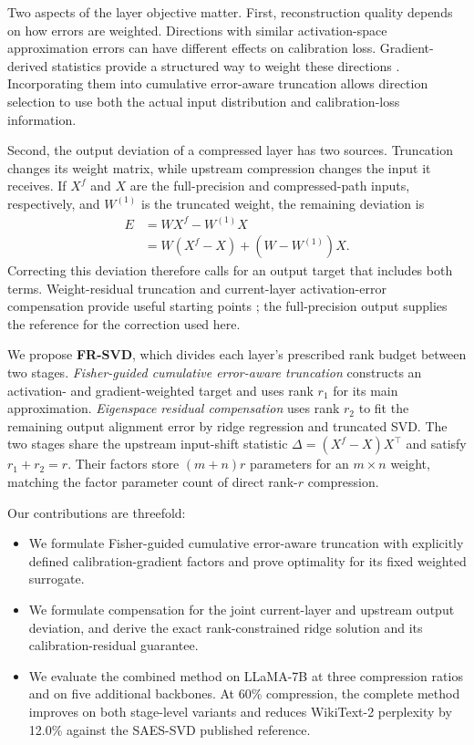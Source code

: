 \documentclass[11pt]{article}
\begin{document}
Two aspects of the layer objective matter. First, reconstruction quality depends on how errors are weighted. Directions with similar activation-space approximation errors can have different effects on calibration loss. Gradient-derived statistics provide a structured way to weight these directions \citep{hsu2022fwsvd,chekalina2025gfwsvd}. Incorporating them into cumulative error-aware truncation allows direction selection to use both the actual input distribution and calibration-loss information.

Second, the output deviation of a compressed layer has two sources. Truncation changes its weight matrix, while upstream compression changes the input it receives. If $X^f$ and $X$ are the full-precision and compressed-path inputs, respectively, and $W^{(1)}$ is the truncated weight, the remaining deviation is
\begin{equation}
\begin{aligned}
E&=WX^f-W^{(1)}X\\
 &=W(X^f-X)+(W-W^{(1)})X.
\end{aligned}
\label{eq:error-decomposition-intro}
\end{equation}
Correcting this deviation therefore calls for an output target that includes both terms. Weight-residual truncation and current-layer activation-error compensation provide useful starting points \citep{bai2025ercsvd,liu2025eora}; the full-precision output supplies the reference for the correction used here.

We propose \textbf{FR-SVD}, which divides each layer's prescribed rank budget between two stages. \emph{Fisher-guided cumulative error-aware truncation} constructs an activation- and gradient-weighted target and uses rank $r_1$ for its main approximation. \emph{Eigenspace residual compensation} uses rank $r_2$ to fit the remaining output alignment error by ridge regression and truncated SVD. The two stages share the upstream input-shift statistic $\Delta=(X^f-X)X^\top$ and satisfy $r_1+r_2=r$. Their factors store $(m+n)r$ parameters for an $m\times n$ weight, matching the factor parameter count of direct rank-$r$ compression.

Our contributions are threefold:
\begin{itemize}
\item We formulate Fisher-guided cumulative error-aware truncation with explicitly defined calibration-gradient factors and prove optimality for its fixed weighted surrogate.
\item We formulate compensation for the joint current-layer and upstream output deviation, and derive the exact rank-constrained ridge solution and its calibration-residual guarantee.
\item We evaluate the combined method on LLaMA-7B at three compression ratios and on five additional backbones. At 60\% compression, the complete method improves on both stage-level variants and reduces WikiText-2 perplexity by 12.0\% against the SAES-SVD published reference.
\end{itemize}
\end{document}
